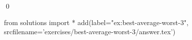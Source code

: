 
\begin{ex} 
  \label{ex:best-average-worst-3}
  
  \qed
\end{ex} 
\begin{python0}
from solutions import *
add(label="ex:best-average-worst-3",
    srcfilename='exercises/best-average-worst-3/answer.tex') 
\end{python0}
